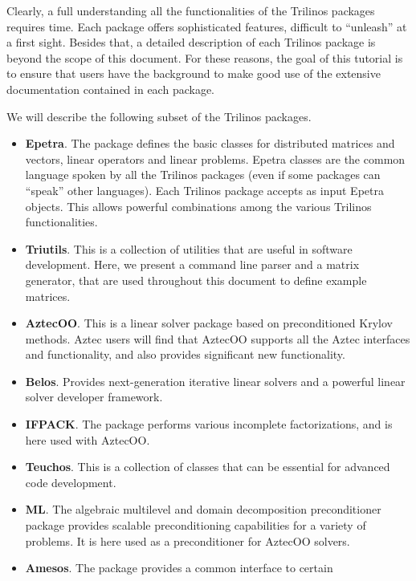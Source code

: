 Clearly, a full understanding all the functionalities of the Trilinos
packages requires time.  Each package offers sophisticated features,
difficult to ``unleash'' at a first sight.  Besides that, a detailed
description of each Trilinos package is beyond the scope of this
document. For these reasons, the goal of this tutorial is to ensure that
users have the background to make good use of the extensive
documentation contained in each package.

\medskip

We will describe the following subset of the Trilinos packages.
\begin{itemize}
\item {\bf Epetra}. The package defines the basic classes for
  distributed matrices and vectors, linear operators and linear
  problems. Epetra classes are the common language spoken by all the
  Trilinos packages (even if some packages can ``speak'' other
  languages). Each Trilinos package accepts as input Epetra objects.
  This allows powerful combinations among the various Trilinos
  functionalities.
\item {\bf Triutils}. This is a collection of utilities that are useful
  in software development. Here, we present a command line parser and a
  matrix generator, that are used throughout this document to define
  example matrices.
\item {\bf AztecOO}. This is a linear solver package based on
  preconditioned Krylov methods. Aztec users will find that AztecOO
  supports all the Aztec interfaces and functionality, and also provides
  significant new functionality.
\item {\bf Belos}. Provides next-generation iterative linear solvers and a
powerful linear solver developer framework.
\item {\bf IFPACK}. The package performs various incomplete
  factorizations, and is here used with AztecOO.
\item {\bf Teuchos}. This is a collection of classes that can be
  essential for advanced code development.
\item {\bf ML}. The algebraic multilevel and domain decomposition
  preconditioner package provides scalable preconditioning capabilities
  for a variety of problems. It is here used as a preconditioner
  for AztecOO solvers.
\item {\bf Amesos}. The package provides a common interface to certain

\end{itemize}

